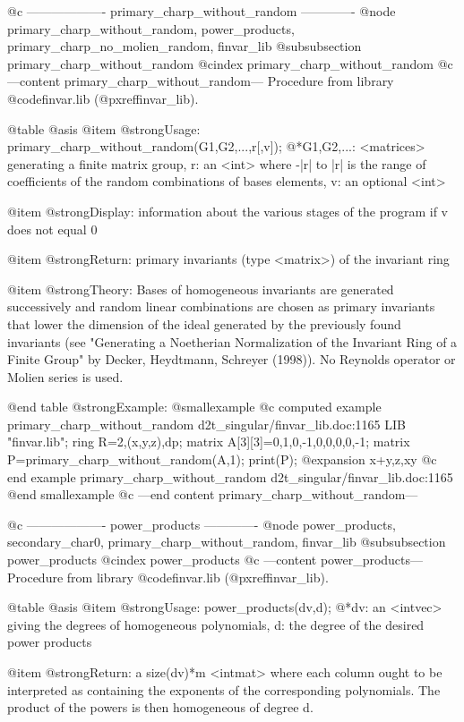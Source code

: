 @c ------------------- primary_charp_without_random -------------
@node primary_charp_without_random, power_products, primary_charp_no_molien_random, finvar_lib
@subsubsection primary_charp_without_random
@cindex primary_charp_without_random
@c ---content primary_charp_without_random---
Procedure from library @code{finvar.lib} (@pxref{finvar_lib}).

@table @asis
@item @strong{Usage:}
primary_charp_without_random(G1,G2,...,r[,v]);
@*G1,G2,...: <matrices> generating a finite matrix group, r: an <int>
where -|r| to |r| is the range of coefficients of the random
combinations of bases elements, v: an optional <int>

@item @strong{Display:}
information about the various stages of the program if v does not
equal 0

@item @strong{Return:}
primary invariants (type <matrix>) of the invariant ring

@item @strong{Theory:}
Bases of homogeneous invariants are generated successively and random
linear combinations are chosen as primary invariants that lower the
dimension of the ideal generated by the previously found invariants
(see "Generating a Noetherian Normalization of the Invariant Ring of
a Finite Group" by Decker, Heydtmann, Schreyer (1998)). No Reynolds
operator or Molien series is used.

@end table
@strong{Example:}
@smallexample
@c computed example primary_charp_without_random d2t_singular/finvar_lib.doc:1165 
LIB "finvar.lib";
ring R=2,(x,y,z),dp;
matrix A[3][3]=0,1,0,-1,0,0,0,0,-1;
matrix P=primary_charp_without_random(A,1);
print(P);
@expansion{} x+y,z,xy
@c end example primary_charp_without_random d2t_singular/finvar_lib.doc:1165
@end smallexample
@c ---end content primary_charp_without_random---

@c ------------------- power_products -------------
@node power_products, secondary_char0, primary_charp_without_random, finvar_lib
@subsubsection power_products
@cindex power_products
@c ---content power_products---
Procedure from library @code{finvar.lib} (@pxref{finvar_lib}).

@table @asis
@item @strong{Usage:}
power_products(dv,d);
@*dv: an <intvec> giving the degrees of homogeneous polynomials, d: the
degree of the desired power products

@item @strong{Return:}
a size(dv)*m <intmat> where each column ought to be interpreted as
containing the exponents of the corresponding polynomials. The product
of the powers is then homogeneous of degree d.

